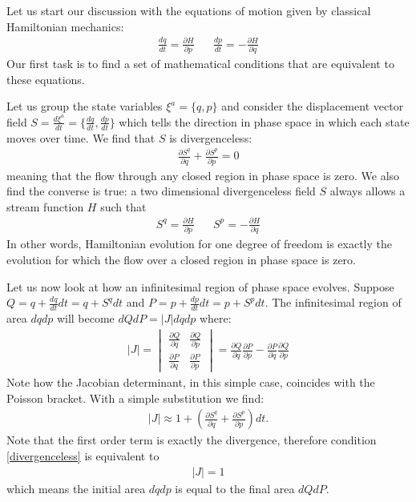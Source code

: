 \documentclass[10pt,twocolumn, nofootinbib]{revtex4-2}
\begin{document}
Let us start our discussion with the equations of motion given by classical Hamiltonian mechanics:
\begin{align}\label{HamiltonEquations1}
	\frac{dq}{dt} = \frac{\partial H}{\partial p} \; \; \; \; \; \; \frac{dp}{dt} = - \frac{\partial H}{\partial q}
\end{align}
Our first task is to find a set of mathematical conditions that are equivalent to these equations.

Let us group the state variables $\xi^a = \{q, p\}$ and consider the displacement vector field $S = \frac{d\xi^a}{dt} = \{ \frac{dq}{dt}, \frac{dp}{dt} \} $ which tells the direction in phase space in which each state moves over time. We find that $S$ is divergenceless:
\begin{align}\label{divergenceless}
\frac{\partial S^q}{\partial q} + \frac{\partial S^p}{\partial p} =0
\end{align}
meaning that the flow through any closed region in phase space is zero. We also find the converse is true: a two dimensional divergenceless field $S$ always allows a stream function $H$ such that
\begin{align}
	S^q = \frac{\partial H}{\partial p} \; \; \; \; \; \; S^p = - \frac{\partial H}{\partial q}
\end{align}
In other words, Hamiltonian evolution for one degree of freedom is exactly the evolution for which the flow over a closed region in phase space is zero.

Let us now look at how an infinitesimal region of phase space evolves. Suppose $Q = q + \frac{dq}{dt} dt = q + S^q dt$ and $P = p + \frac{dp}{dt} dt = p + S^p dt$. The infinitesimal region of area $dq dp$ will become $dQ dP = |J| dq dp$ where:
\begin{align}
	|J| = \begin{vmatrix}
		\frac{\partial Q}{\partial q} & \frac{\partial Q}{\partial p} \\
		\frac{\partial P}{\partial q} & \frac{\partial P}{\partial  p} 
	\end{vmatrix} = \frac{\partial Q}{\partial q} \frac{\partial P}{\partial  p} - \frac{\partial P}{\partial q} \frac{\partial Q}{\partial p}
\end{align}
Note how the Jacobian determinant, in this simple case, coincides with the Poisson bracket. With a simple substitution we find:
\begin{align}
	|J|\approx 1 + \left( \frac{\partial S^q}{\partial q} + \frac{\partial S^p}{\partial p} \right)dt.
\end{align}
Note that the first order term is exactly the divergence, therefore condition \eqref{divergenceless} is equivalent to
\begin{align}\label{UnitaryJacobian}
	|J| = 1
\end{align}
which means the initial area $dqdp$ is equal to the final area $dQdP$.
\end{document}

